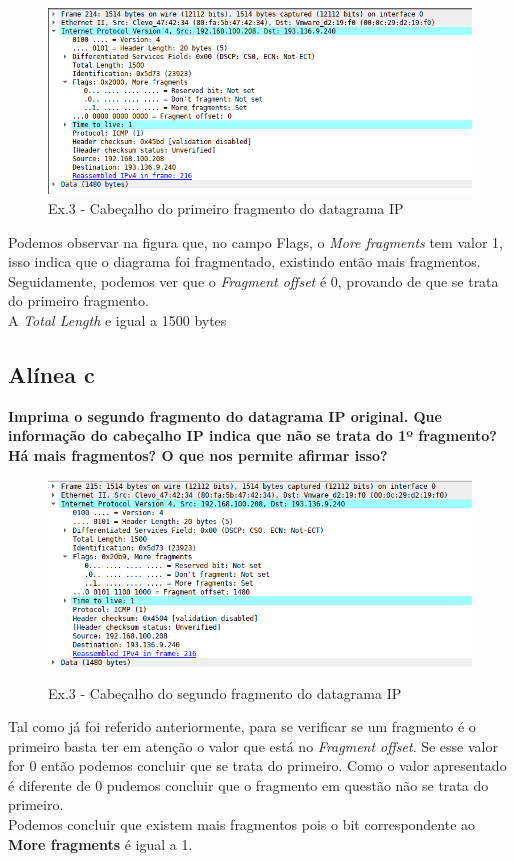 \documentclass[a4paper]{report}
\begin{document}
\begin{figure}[H]
    \centering 
    \includegraphics[width=\textwidth]{images/fragmentDatagramaIpEx3.png}
    \caption{Ex.3 - Cabeçalho do primeiro fragmento do datagrama IP}
    \label{fig:fragmentDatagramaIpEx3}
\end{figure}
Podemos observar na figura que, no campo Flags, o \textit{More fragments} tem
valor 1, isso indica que o diagrama foi fragmentado, existindo então mais
fragmentos.\\
Seguidamente, podemos ver que o \textit{Fragment offset} é 0, provando de que se
trata do primeiro fragmento.\\
A \textit{Total Length} e igual a 1500 bytes

\subsection{Alínea c}
\textbf{Imprima o segundo fragmento do datagrama IP original. Que informação do
cabeçalho IP indica que não se trata do 1º fragmento? Há mais fragmentos? O que
nos permite afirmar isso?}

\begin{figure}[H]
    \centering 
    \includegraphics[width=\textwidth]{images/fragment2DatagramaIpEx3.png}
    \caption{Ex.3 - Cabeçalho do segundo fragmento do datagrama IP}
    \label{fig:fragment2DatagramaIpEx3}
\end{figure}
Tal como já foi referido anteriormente, para se verificar se um fragmento é o
primeiro basta ter em atenção o valor que está no \textit{Fragment offset}. Se
esse valor for 0 então podemos concluir que se trata do primeiro. Como o valor
apresentado é diferente de 0 pudemos concluir que o fragmento em questão não se
trata do primeiro.\\
Podemos concluir que existem mais fragmentos pois o bit correspondente ao
\textbf{More fragments} é igual a 1.
\end{document}
